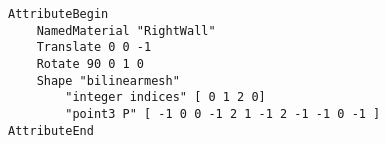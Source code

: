 




\begin{lstlisting}[style=PBRT, caption={Fragment kodu tworzący prymityw \textbf{bilinearmesh}}, label={code: primitive-bilinearmesh}, basicstyle=\fontsize{12}{8}\selectfont\ttfamily]
AttributeBegin
    NamedMaterial "RightWall"
    Translate 0 0 -1
    Rotate 90 0 1 0 
    Shape "bilinearmesh"
        "integer indices" [ 0 1 2 0]
        "point3 P" [ -1 0 0 -1 2 1 -1 2 -1 -1 0 -1 ]
AttributeEnd
\end{lstlisting}









